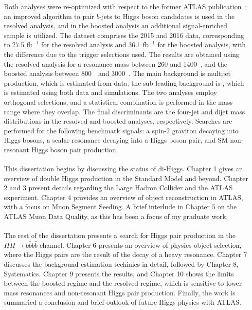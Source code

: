 Both analyses were re-optimized with respect to the former ATLAS publication~\cite{EXOT-2015-11}; an improved algorithm to pair $b$-jets to Higgs boson candidates is used in the resolved analysis, and in the boosted analysis an additional signal-enriched sample is utilized. The dataset comprises the 2015 and 2016 data, corresponding to 27.5 $\mathrm{fb}^{-1}$ for the resolved analysis and 36.1 $\mathrm{fb}^{-1}$ for the boosted analysis, with the difference due to the trigger selections used. The results are obtained using the resolved analysis for a resonance mass between 260 and 1400~\GeV, and the boosted analysis between 800~\GeV\ and 3000~\GeV. The main background is multijet production, which is estimated from data; the sub-leading background is \ttbar, which is estimated using both data and simulations. The two analyses employ orthogonal selections, and a statistical combination is performed in the mass range where they overlap. The final discriminants are the four-jet and dijet mass distributions in the resolved and boosted analyses, respectively. Searches are performed for the following benchmark signals: a spin-2 graviton decaying into Higgs bosons, a scalar resonance decaying into a Higgs boson pair, and SM non-resonant Higgs boson pair production.


\paragraph{}
This dissertation begins by discussing the status of di-Higgs. Chapter 1 gives an overview of double Higgs production in the Standard Model and beyond. Chapter 2 and 3 present details regarding the Large Hadron Collider and the ATLAS experiment. Chapter 4 provides an overview of object reconstruction in ATLAS, with a focus on Muon Segment Seeding. A brief interlude in Chapter 5 on the ATLAS Muon Data Quality, as this has been a focus of my graduate work. 

\paragraph{}
The rest of the dissertation presents a search for Higgs pair production in the $HH \to b\bar{b} b\bar{b}$ channel. Chapter 6 presents an overview of physics object selection, where the Higgs pairs are the result of the decay of a heavy resonance. Chapter 7 discusses the background estimation techinics in detail, followed by Chapter 8, Systematics. Chapter 9 presents the results, and Chapter 10 shows the limits between the boosted regime and the resolved regime, which is sensitive to lower mass resonances and non-resonant Higgs pair production. Finally, the work is summaried a conclusion and brief outlook of future Higgs physics with ATLAS.



